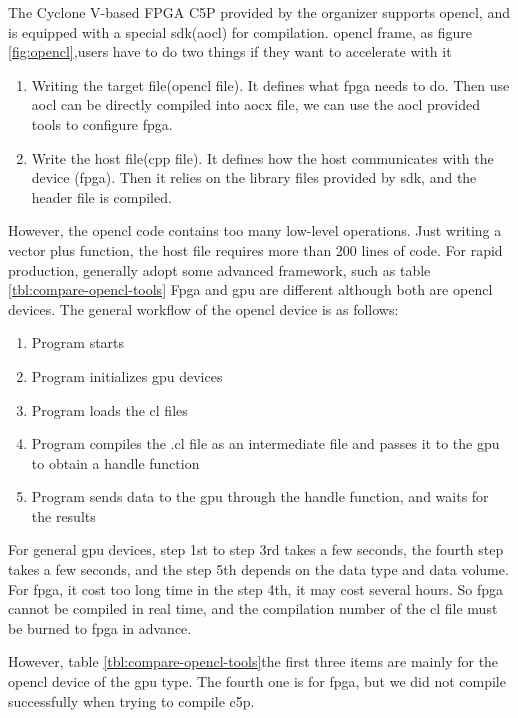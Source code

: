 The Cyclone V-based FPGA C5P provided by the organizer supports opencl, and is equipped with a special sdk(aocl) for compilation.
opencl frame, as figure \ref{fig:opencl},users have to do two things if they want to accelerate with it
\begin{enumerate}
  \item Writing the target file(opencl file). It defines what fpga needs to do. Then use aocl can be directly compiled into aocx file, we can use the aocl provided tools to configure fpga.
  \item Write the host file(cpp file). It defines how the host communicates with the device (fpga). Then it relies on the library files provided by sdk, and the header file is compiled.
\end{enumerate}

However, the opencl code contains too many low-level operations. Just writing a vector plus function, the host file requires more than 200 lines of code. For rapid production, generally adopt some advanced framework, such as table \ref{tbl:compare-opencl-tools}
Fpga and gpu are different although both are opencl devices.
The general workflow of the opencl device is as follows:
\begin{enumerate}
  \item Program starts
  \item Program initializes gpu devices
  \item	Program loads the cl files
  \item	Program compiles the .cl file as an intermediate file and passes it to the gpu to obtain a handle function
  \item Program sends data to the gpu through the handle function, and waits for the results
\end{enumerate}

For general gpu devices, step 1st to step 3rd takes a few seconds, the fourth step takes a few seconds, and the step 5th depends on the data type and data volume.
For fpga, it cost too long time in the step 4th, it may cost several hours. So fpga cannot be compiled in real time, and the compilation number of the cl file must be burned to fpga in advance.

However, table \ref{tbl:compare-opencl-tools}the first three items are mainly for the opencl device of the gpu type. The fourth one is for fpga, but we did not compile successfully when trying to compile c5p.

